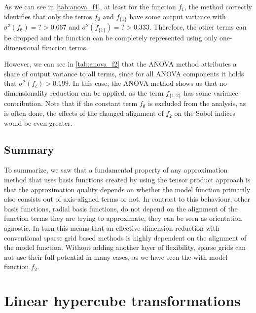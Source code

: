\documentclass[
  a4paper,  %
  twoside,  %
  bibliography=totoc,
  headsepline,
  cleardoublepage=empty,
  parskip=half,
  draft=false
]{scrbook}
\begin{document}
As we can see in \cref{tab:anova_f1}, at least for the function $f_1$, the method correctly identifies that only the terms $f_\emptyset$ and $f_{\{1\}}$ have some output variance with $\sigma^2(f_\emptyset)=? > 0.667$ and $\sigma^2(f_{\{1\}})=? > 0.333$.
Therefore, the other terms can be dropped and the function can be completely represented using only one-dimensional function terms.

However, we can see in \cref{tab:anova_f2} that the ANOVA method attributes a share of output variance to all terms, since for all ANOVA components it holds that $\sigma^2(f_{c}) > 0.199$.
In this case, the ANOVA method shows us that no dimensionality reduction can be applied, as the term $f_{\{1,2\}}$ has some variance contribution.
Note that if the constant term $f_\emptyset$ is excluded from the analysis, as is often done, the effects of the changed alignment of $f_2$ on the Sobol indices would be even greater.

\subsection{Summary}

To summarize, we saw that a fundamental property of any approximation method that uses basis functions created by using the tensor product approach is that the approximation quality depends on whether the model function primarily also consists out of axis-aligned terms or not.
In contrast to this behaviour, other basis functions, \eg radial basis functions, do not depend on the alignment of the function terms they are trying to approximate, \ie they can be seen as orientation agnostic.
In turn this means that an effective dimension reduction with conventional sparse grid based methods is highly dependent on the alignment of the model function.
Without adding another layer of flexibility, sparse grids can not use their full potential in many cases, as we have seen the with model function $f_2$.

\section{Linear hypercube transformations}
\end{document}
